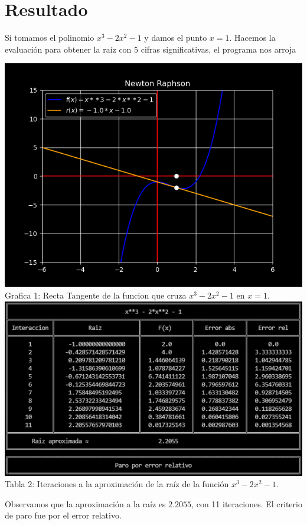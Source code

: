 \documentclass[12pt]{article}
\begin{document}
		\section*{\centering Resultado}\label{sec:Resultado}
			Si tomamos el polinomio $ x^3-2x^2-1 $ y damos el punto $ x = 1 $. Hacemos 
			la evaluación para obtener la raíz con 5 cifras significativas, el programa nos arroja
			\begin{multicols}{2}
				\begin{center}
					\includegraphics[width=\linewidth]{Grafica 1.png}
					Grafica 1: Recta Tangente de la funcion que cruza \columnbreak $ x^3-2x^2-1 $ en $ x = 1 $.\\
					\includegraphics[width=\linewidth]{Tabla 1.png}
					Tabla 2: Iteraciones a la aproximación de la raíz de la función $ x^3-2x^2-1 $.
				\end{center}
			\end{multicols}
			Observamos que la aproximación a la raíz es $ 2.2055 $, con 11 iteraciones. El criterio de paro fue 
			por el error relativo.
\end{document}
